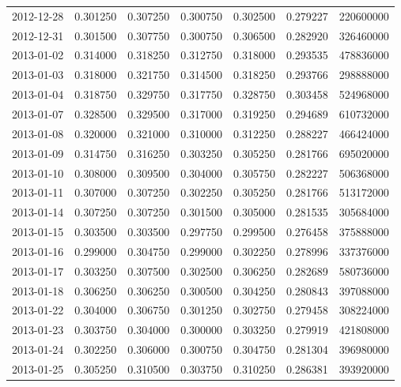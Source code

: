 \begin{tabular}{lrrrrrr}
2012-12-28 &    0.301250 &    0.307250 &    0.300750 &    0.302500 &    0.279227 &   220600000 \\
2012-12-31 &    0.301500 &    0.307750 &    0.300750 &    0.306500 &    0.282920 &   326460000 \\
2013-01-02 &    0.314000 &    0.318250 &    0.312750 &    0.318000 &    0.293535 &   478836000 \\
2013-01-03 &    0.318000 &    0.321750 &    0.314500 &    0.318250 &    0.293766 &   298888000 \\
2013-01-04 &    0.318750 &    0.329750 &    0.317750 &    0.328750 &    0.303458 &   524968000 \\
2013-01-07 &    0.328500 &    0.329500 &    0.317000 &    0.319250 &    0.294689 &   610732000 \\
2013-01-08 &    0.320000 &    0.321000 &    0.310000 &    0.312250 &    0.288227 &   466424000 \\
2013-01-09 &    0.314750 &    0.316250 &    0.303250 &    0.305250 &    0.281766 &   695020000 \\
2013-01-10 &    0.308000 &    0.309500 &    0.304000 &    0.305750 &    0.282227 &   506368000 \\
2013-01-11 &    0.307000 &    0.307250 &    0.302250 &    0.305250 &    0.281766 &   513172000 \\
2013-01-14 &    0.307250 &    0.307250 &    0.301500 &    0.305000 &    0.281535 &   305684000 \\
2013-01-15 &    0.303500 &    0.303500 &    0.297750 &    0.299500 &    0.276458 &   375888000 \\
2013-01-16 &    0.299000 &    0.304750 &    0.299000 &    0.302250 &    0.278996 &   337376000 \\
2013-01-17 &    0.303250 &    0.307500 &    0.302500 &    0.306250 &    0.282689 &   580736000 \\
2013-01-18 &    0.306250 &    0.306250 &    0.300500 &    0.304250 &    0.280843 &   397088000 \\
2013-01-22 &    0.304000 &    0.306750 &    0.301250 &    0.302750 &    0.279458 &   308224000 \\
2013-01-23 &    0.303750 &    0.304000 &    0.300000 &    0.303250 &    0.279919 &   421808000 \\
2013-01-24 &    0.302250 &    0.306000 &    0.300750 &    0.304750 &    0.281304 &   396980000 \\
2013-01-25 &    0.305250 &    0.310500 &    0.303750 &    0.310250 &    0.286381 &   393920000 \\

\end{tabular}
